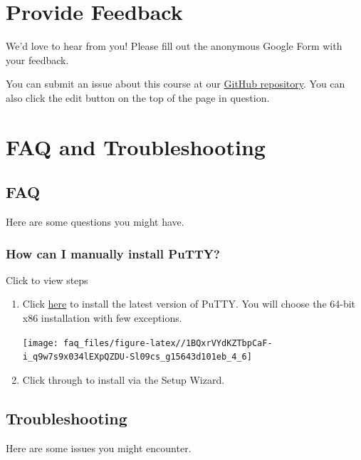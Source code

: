 \documentclass[
]{book}
\begin{document}
\hypertarget{feedback}{%
\chapter{Provide Feedback}\label{feedback}}

We'd love to hear from you! Please fill out the anonymous Google Form with your feedback.

You can submit an issue about this course at our \href{https://github.com/fhdsl/FH_Cluster_Guide/issues/new}{GitHub repository}. You can also click the edit button on the top of the page in question.

\hypertarget{faq-and-troubleshooting}{%
\chapter{FAQ and Troubleshooting}\label{faq-and-troubleshooting}}

\hypertarget{faq}{%
\section{FAQ}\label{faq}}

Here are some questions you might have.

\hypertarget{manual-putty}{%
\subsection{How can I manually install PuTTY?}\label{manual-putty}}

Click to view steps

\begin{enumerate}
\def\labelenumi{\arabic{enumi}.}
\item
  Click \href{https://www.chiark.greenend.org.uk/~sgtatham/putty/latest.html}{here} to install the latest version of PuTTY. You will choose the 64-bit x86 installation with few exceptions.

  \texttt{[image: faq\_files/figure-latex//1BQxrVYdKZTbpCaF-i\_q9w7s9x034lEXpQZDU-Sl09cs\_g15643d101eb\_4\_6]}
\item
  Click through to install via the Setup Wizard.
\end{enumerate}

\hypertarget{troubleshooting}{%
\section{Troubleshooting}\label{troubleshooting}}

Here are some issues you might encounter.
\end{document}
